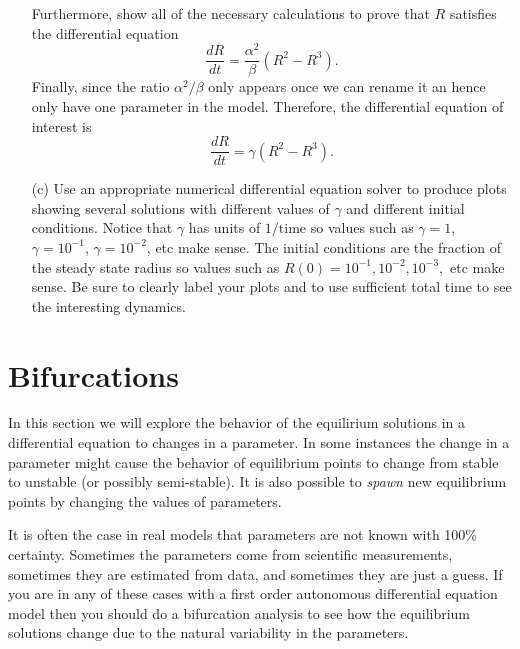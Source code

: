 \begin{problem}
\begin{enumerate}
            Furthermore, show all of the necessary calculations to prove that $R$
            satisfies the differential equation
            \[ \frac{dR}{dt} = \frac{\alpha^2}{\beta} \left( R^2 - R^3 \right). \]
            Finally, since the ratio $\alpha^2/\beta$ only appears once we can rename it
            an hence only have one parameter in the model.  Therefore, the differential
            equation of interest is
            \[ \frac{dR}{dt} = \gamma \left( R^2 - R^3 \right). \]
        \item[(c)] Use an appropriate numerical differential equation solver to produce
            plots showing several solutions with different values of $\gamma$ and
            different initial conditions.  Notice that $\gamma$ has units of
            $1/\text{time}$ so values such as $\gamma=1$, $\gamma=10^{-1}$,
            $\gamma=10^{-2}$, etc make sense.  The initial conditions are the fraction of
            the steady state radius so values such as $R(0) = 10^{-1}, 10^{-2}, 10^{-3},$
            etc make sense.  Be sure to clearly label your plots and to use sufficient
            total time to see the interesting dynamics.
    \end{enumerate}
\end{problem}




\newpage\section{Bifurcations}
In this section we will explore the behavior of the equilirium solutions in a differential
equation to changes in a parameter.  In some instances the change in a parameter might
cause the behavior of equilibrium points to change from stable to unstable (or possibly
semi-stable).  It is also possible to {\it spawn} new equilibrium points by changing the
values of parameters. 

It is often the case in real models that parameters are not known with 100\% certainty.
Sometimes the parameters come from scientific measurements, sometimes they are estimated
from data, and sometimes they are just a guess.  If you are in any of these cases with a
first order autonomous differential equation model then you should do a bifurcation
analysis to see how the equilibrium solutions change due to the natural variability in the
parameters.  

